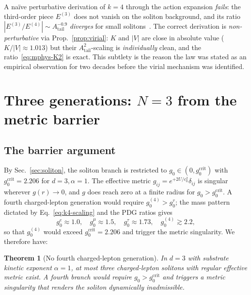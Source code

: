 \documentclass[11pt,a4paper]{article}
\newcommand{\Atail}{A_{\mathrm{tail}}}
\newcommand{\gcrit}{g_{0}^{\mathrm{crit}}}
\newtheorem{theorem}{Theorem}
\begin{document}
A na\"ive perturbative derivation of $k=4$ through the action expansion
\emph{fails}: the third-order piece $E^{(3)}$ does not vanish on the
soliton background, and its ratio $|E^{(3)}/E^{(4)}|\sim \Atail^{-0.9}$
\emph{diverges} for small solitons~\cite{TGP-repo}. The correct
derivation is \emph{non-perturbative} via
Prop.~\ref{prop:virial}: $K$ and $|V|$ are close in absolute value
($K/|V|\approx 1.013$) but their $\Atail^{2}$-scaling is
\emph{individually} clean, and the ratio~\eqref{eq:mphys-K2} is exact.
This subtlety is the reason the law was stated as an empirical
observation for two decades before the virial mechanism was
identified.

\section{Three generations: \texorpdfstring{$N=3$}{N=3} from the metric barrier}\label{sec:N3}

\subsection{The barrier argument}

By Sec.~\ref{sec:soliton}, the soliton branch is restricted to
$g_{0}\in(0,\gcrit)$ with $\gcrit=2.206$ for $d=3,\alpha=1$. The
effective metric $g_{ij}=e^{+2U/c_{0}^{2}}\delta_{ij}$ is singular
wherever $g(r)\to 0$, and $g$ does reach zero at a finite radius for
$g_{0}>\gcrit$. A fourth charged-lepton generation would require
$g_{0}^{(4)}>g_{0}^{\tau}$; the mass pattern dictated by
Eq.~\eqref{eq:k4-scaling} and the PDG ratios gives
\begin{equation}
  g_{0}^{e}\!\approx\!1.0,\quad
  g_{0}^{\mu}\!\approx\!1.5,\quad
  g_{0}^{\tau}\!\approx\!1.73,\quad
  g_{0}^{(4)}\!\gtrsim\!2.2,
\end{equation}
so that $g_{0}^{(4)}$ would exceed $\gcrit=2.206$ and trigger the
metric singularity. We therefore have:

\begin{theorem}[No fourth charged-lepton generation]\label{thm:N3}
In $d=3$ with substrate kinetic exponent $\alpha=1$, at most three
charged-lepton solitons with regular effective metric exist. A fourth
branch would require $g_{0}>\gcrit$ and triggers a metric singularity
that renders the soliton dynamically inadmissible.
\end{theorem}
\end{document}
